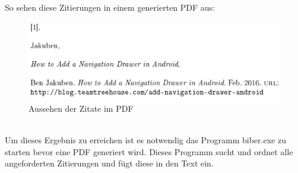\documentclass[FIPLY_base.tex]{subfiles}
\begin{document}
\ \\
So sehen diese Zitierungen in einem generierten PDF aus:
\begin{figure}[H]
	\includegraphics[scale=0.5]{img/Citations}
	\caption{Aussehen der Zitate im PDF}
\end{figure}
\ \\
Um dieses Ergebnis zu erreichen ist es notwendig das Programm biber.exe zu starten bevor eine PDF generiert wird.
Dieses Programm sucht und ordnet alle angeforderten Zitierungen und fügt diese in den Text ein.


%
%
%
\end{document}
